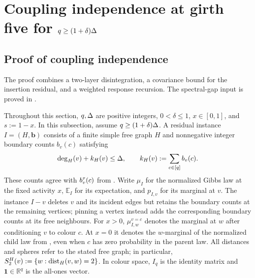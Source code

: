 \section{\texorpdfstring{Coupling independence at girth five for $q\ge(1+\delta)\Delta$}{Coupling independence at girth five for q >= (1+delta) Delta}}
\label{app:girth5-covariance}\label{sec:girth5-ci}

\subsection{Proof of coupling independence}

The proof combines a two-layer disintegration, a covariance bound for the
insertion residual, and a weighted response recursion.  The spectral-gap
input is proved in .

Throughout this section, $q,\Delta$ are positive integers,
$0<\delta\le1$, $x\in[0,1]$, and $s:=1-x$.
In this subsection, assume $q\ge(1+\delta)\Delta$.
A residual instance $I=(H,\mathbf b)$ consists of a finite simple free
graph $H$ and nonnegative integer boundary counts $b_v(c)$ satisfying
\begin{equation}\label{eq:girth5-degree-budget}
 \deg_H(v)+k_H(v)\le\Delta,
 \qquad k_H(v):=\sum_{c\in[q]}b_v(c).
\end{equation}
These counts agree with $b_v^\tau(c)$ from .  Write
$\mu_I$ for the normalized Gibbs law at the fixed activity $x$,
$\mathbb E_I$ for its expectation, and $p_{I,v}$ for its marginal at $v$.
The instance $I-v$ deletes $v$ and its incident edges but retains the
boundary counts at the remaining vertices; pinning a vertex instead adds
the corresponding boundary counts at its free neighbours.
For $x>0$, $\mu_{I,w}^{v=c}$ denotes the marginal at $w$ after conditioning
$v$ to colour $c$.  At $x=0$ it denotes the $w$-marginal of the
normalized child law from , even when $c$ has zero probability
in the parent law.  All distances and spheres refer to the stated free
graph; in particular, $S_2^H(v):=\{w:\operatorname{dist}_H(v,w)=2\}$.
In colour space, $I_q$ is the identity matrix and
$\mathbf1\in\mathbb R^q$ is the all-ones vector.

